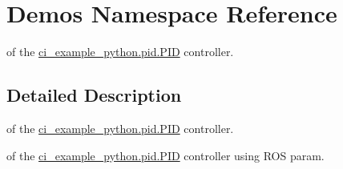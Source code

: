 \hypertarget{namespaceDemos}{}\section{Demos Namespace Reference}
\label{namespaceDemos}


of the \hyperlink{classci__example__python_1_1pid_1_1PID}{ci\+\_\+example\+\_\+python.\+pid.\+P\+ID} controller.  




\subsection{Detailed Description}
of the \hyperlink{classci__example__python_1_1pid_1_1PID}{ci\+\_\+example\+\_\+python.\+pid.\+P\+ID} controller. 

of the \hyperlink{classci__example__python_1_1pid_1_1PID}{ci\+\_\+example\+\_\+python.\+pid.\+P\+ID} controller using R\+OS param. 